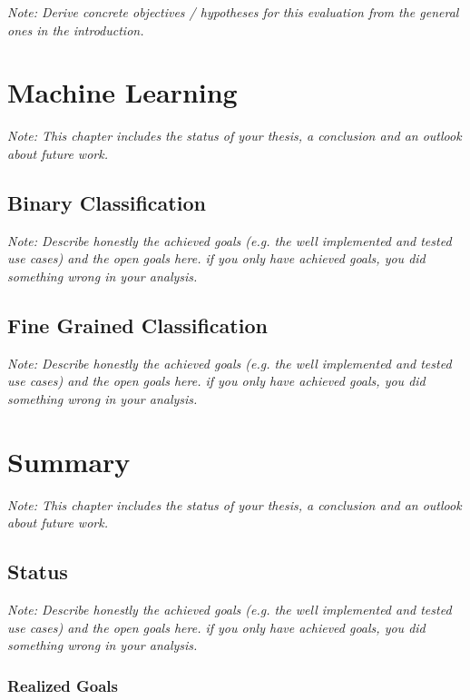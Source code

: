 \documentclass[a4paper,12pt,twoside]{report}
\begin{document}
\textit{Note: Derive concrete objectives / hypotheses for this evaluation from the general ones in the introduction.}


\chapter{Machine Learning}

\textit{Note: This chapter includes the status of your thesis, a conclusion and an outlook about future work.}

\section{Binary Classification}

\textit{Note: Describe honestly the achieved goals (e.g. the well implemented and tested use cases) and the open goals here. if you only have achieved goals, you did something wrong in your analysis.}

\section{Fine Grained Classification}

\textit{Note: Describe honestly the achieved goals (e.g. the well implemented and tested use cases) and the open goals here. if you only have achieved goals, you did something wrong in your analysis.}


\chapter{Summary}

\textit{Note: This chapter includes the status of your thesis, a conclusion and an outlook about future work.}

\section{Status}

\textit{Note: Describe honestly the achieved goals (e.g. the well implemented and tested use cases) and the open goals here. if you only have achieved goals, you did something wrong in your analysis.}

\subsection{Realized Goals}
\end{document}
